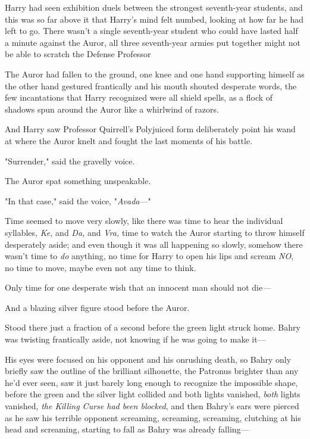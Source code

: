 Harry had seen exhibition duels between the strongest seventh-year students,
and this was so far above it that Harry's mind felt numbed, looking at how far
he had left to go. There wasn't a single seventh-year student who could have
lasted half a minute against the Auror, all three seventh-year armies put
together might not be able to scratch the Defense Professor{\el}

The Auror had fallen to the ground, one knee and one hand supporting himself as
the other hand gestured frantically and his mouth shouted desperate words, the
few incantations that Harry recognized were all shield spells, as a flock of
shadows spun around the Auror like a whirlwind of razors.

And Harry saw Professor Quirrell's Polyjuiced form deliberately point his wand
at where the Auror knelt and fought the last moments of his battle.

"Surrender," said the gravelly voice.

The Auror spat something unspeakable.

"In that case," said the voice, "\emph{Avada}---"

Time seemed to move very slowly, like there was time to hear the individual
syllables, \emph{Ke,} and \emph{Da,} and \emph{Vra,} time to watch the Auror
starting to throw himself desperately aside; and even though it was all
happening so slowly, somehow there wasn't time to \emph{do} anything, no time
for Harry to open his lips and scream \emph{NO}, no time to move, maybe even
not any time to think.

Only time for one desperate wish that an innocent man should not die\emph{---}

And a blazing silver figure stood before the Auror.

Stood there just a fraction of a second before the green light struck home.
\sbreak
Bahry was twisting frantically aside, not knowing if he was going to make it---

His eyes were focused on his opponent and his onrushing death, so Bahry only
briefly saw the outline of the brilliant silhouette, the Patronus brighter than
any he'd ever seen, saw it just barely long enough to recognize the impossible
shape, before the green and the silver light collided and both lights vanished,
\emph{both} lights vanished, \emph{the Killing Curse had been blocked}, and
then Bahry's ears were pierced as he saw his terrible opponent screaming,
screaming, screaming, clutching at his head and screaming, starting to fall as
Bahry was already falling---

